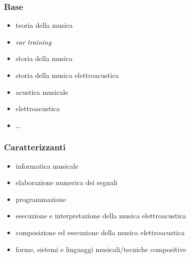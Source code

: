 \begin{frame}
  \frametitle<+->{Base}

	\begin{itemize}

    \item teoria della musica

    \item \emph{ear training}

    \item storia della musica

    \item storia della musica elettroacustica

    \item acustica musicale

    \item elettroacustica

    \item \ldots

	\end{itemize}

\end{frame}

\begin{frame}
  \frametitle<+->{Caratterizzanti}

	\begin{itemize}

    \item informatica musicale

    \item elaborazione numerica dei segnali

    \item programmazione

    \item esecuzione e interpretazione della musica elettroacustica

    \item composizione ed esecuzione della musica elettroacustica

    \item forme, sistemi e linguaggi musicali/tecniche compositive

	\end{itemize}

\end{frame}

